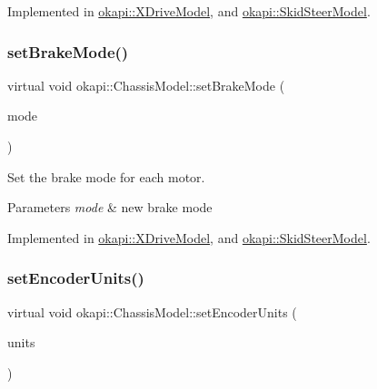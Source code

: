 Implemented in \mbox{\hyperlink{classokapi_1_1XDriveModel_ab9a2d6f5e1f44b2c8640d41a534d4869}{okapi\+::\+X\+Drive\+Model}}, and \mbox{\hyperlink{classokapi_1_1SkidSteerModel_af02dab85c80cf8aa226b33a39851feff}{okapi\+::\+Skid\+Steer\+Model}}.

\mbox{\label{classokapi_1_1ChassisModel_a20e3cde96d536e6c722aa5686e5cc8e8}} 
\subsubsection{\texorpdfstring{setBrakeMode()}{setBrakeMode()}}
{\footnotesize\ttfamily virtual void okapi\+::\+Chassis\+Model\+::set\+Brake\+Mode (\begin{DoxyParamCaption}\item[{\mbox{\hyperlink{classokapi_1_1AbstractMotor_a132e0485dbb59a60c3f934338d8fa601}{Abstract\+Motor\+::brake\+Mode}}}]{mode }\end{DoxyParamCaption})\hspace{0.3cm}{\ttfamily [pure virtual]}}

Set the brake mode for each motor.


\begin{DoxyParams}{Parameters}
{\em mode} & new brake mode \\
\hline
\end{DoxyParams}


Implemented in \mbox{\hyperlink{classokapi_1_1XDriveModel_a27356e54c9fd0361d01de4c81ff851e7}{okapi\+::\+X\+Drive\+Model}}, and \mbox{\hyperlink{classokapi_1_1SkidSteerModel_a84c100815058f4dcdc958b3349713f73}{okapi\+::\+Skid\+Steer\+Model}}.

\mbox{\label{classokapi_1_1ChassisModel_ae8ba9a72bf827af4c6feffaac99b33ee}} 
\subsubsection{\texorpdfstring{setEncoderUnits()}{setEncoderUnits()}}
{\footnotesize\ttfamily virtual void okapi\+::\+Chassis\+Model\+::set\+Encoder\+Units (\begin{DoxyParamCaption}\item[{\mbox{\hyperlink{classokapi_1_1AbstractMotor_ae811cd825099f2defadeb1b7f7e7764c}{Abstract\+Motor\+::encoder\+Units}}}]{units }\end{DoxyParamCaption})\hspace{0.3cm}{\ttfamily [pure virtual]}}

